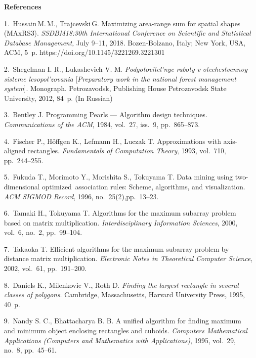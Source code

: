 

{\small



\vskip6mm

\noindent \textbf{References} }

\vskip 2mm

{\footnotesize

1.~Hussain\,M.\,M., Trajcevski\,G. Maximizing area-range sum for
spatial shapes (MAxRS3). {\it SSDBM18:\linebreak 30th
International Conference on Scientific and Statistical Database
Management}, July 9--11, 2018. Bozen-Bolzano, Italy; New York,
USA, ACM, 5~p.
https://doi.org/10.1145/3221269.3221301

2.~Shegelman I. R., Lukashevich V. M. {\it Podgotovitel'nye raboty
v otechestvennoy sisteme leso\-pol'zovania  $[$Preparatory work in
the national forest management system}]. Monograph. Petrozavodsk,
Publishing House Petrozavodsk State University, 2012, 84~p. (In
Russian)

3.~Bentley J. Programming Pearls --- Algorithm design techniques.
{\it Communications of the ACM}, 1984, vol.~27, iss.~9,
pp.~865--873.

4.~Fischer P., H\"{o}ffgen K., Lefmann H., Luczak T.
Approximations with axis-aligned rectangles. {\it Fundamentals of
Computation Theory}, 1993, vol.~710, pp.~244--255.

5.~Fukuda T., Morimoto Y., Morishita S., Tokuyama T. Data mining
using two-dimensional opti\-mized~association rules: Scheme,
algorithms, and visualization. {\it ACM SIGMOD Record}, 1996,
no.~25(2),\linebreak pp.~13--23.

6.~Tamaki H., Tokuyama T. Algorithms for the maximum subarray
problem based on matrix multiplication. {\it Interdisciplinary
Information Sciences}, 2000, vol.~6, no.~2, pp.~99--104.

7.~Takaoka T. Efficient algorithms for the maximum subarray
problem by distance matrix multiplication. {\it Electronic Notes
in Theoretical Computer Science}, 2002, vol.~61, pp.~191--200.

8.~Daniels K., Milenkovic V., Roth D. {\it Finding the largest
rectangle in several classes of polygons}. Cambridge,
Massachusetts, Harvard University Press, 1995, 40~p.

9.~Nandy S. C., Bhattacharya B. B. A unified algorithm for finding
maximum and minimum object enclosing rectangles and cuboids. {\it
Computers Mathematical Applications (Computers and Mathematics
with Applications)}, 1995, vol.~29, no.~8, pp.~45--61.

}
